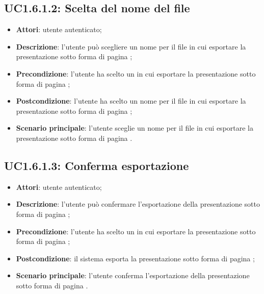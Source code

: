 \subsection{UC1.6.1.2: Scelta del nome del file}
\label{UC1.6.1.2}
\begin{itemize}
\item \textbf{Attori}: utente autenticato;
\item \textbf{Descrizione}: l'utente può scegliere un nome per il file in cui esportare la presentazione sotto forma di pagina ;
\item \textbf{Precondizione}: l'utente ha scelto un  in cui esportare la presentazione sotto forma di pagina ;
\item \textbf{Postcondizione}: l'utente ha scelto un nome per il file in cui esportare la presentazione sotto forma di pagina ;
\item \textbf{Scenario principale}:
l'utente sceglie un nome per il file in cui esportare la presentazione sotto forma di pagina .
\end{itemize}
\subsection{UC1.6.1.3: Conferma esportazione}
\label{UC1.6.1.3}
\begin{itemize}
\item \textbf{Attori}: utente autenticato;
\item \textbf{Descrizione}: l'utente può confermare l'esportazione della presentazione sotto forma di pagina ;
\item \textbf{Precondizione}: l'utente ha scelto un  in cui esportare la presentazione sotto forma di pagina ;
\item \textbf{Postcondizione}: il sistema esporta la presentazione sotto forma di pagina ;
\item \textbf{Scenario principale}:
l'utente conferma l'esportazione della presentazione sotto forma di pagina .
\end{itemize}
